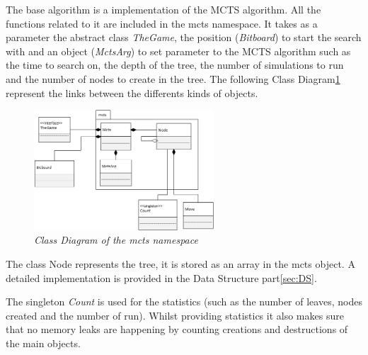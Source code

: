 The base algorithm is a implementation of the MCTS algorithm. All the functions related to it are included in the mcts namespace. It takes as a parameter the abstract class \textit{TheGame}, the position (\textit{Bitboard}) to start the search with and an object (\textit{MctsArg}) to set parameter to the MCTS algorithm such as the time to search on, the depth of the tree, the number of simulations to run and the number of nodes to create in the tree.
The following Class Diagram\ref{fig:MCTSClassDiagram} represent the links between the differents kinds of objects.
\begin{figure}[H] 
\centerline{\includegraphics[width=0.6\textwidth]{Base_Algorithm/Img/MCTSsimple.png}}
\caption{\label{fig:MCTSClassDiagram}\textit{Class Diagram of the mcts namespace}}
\end{figure}
The class Node represents the tree, it is stored as an array in the mcts object. A detailed implementation is provided in the Data Structure part\ref{sec:DS}.

The singleton \textit{Count} is used for the statistics (such as the number of leaves, nodes created and the number of run). Whilst providing statistics it also makes sure that no  memory leaks are happening by counting creations and destructions of the main objects.

